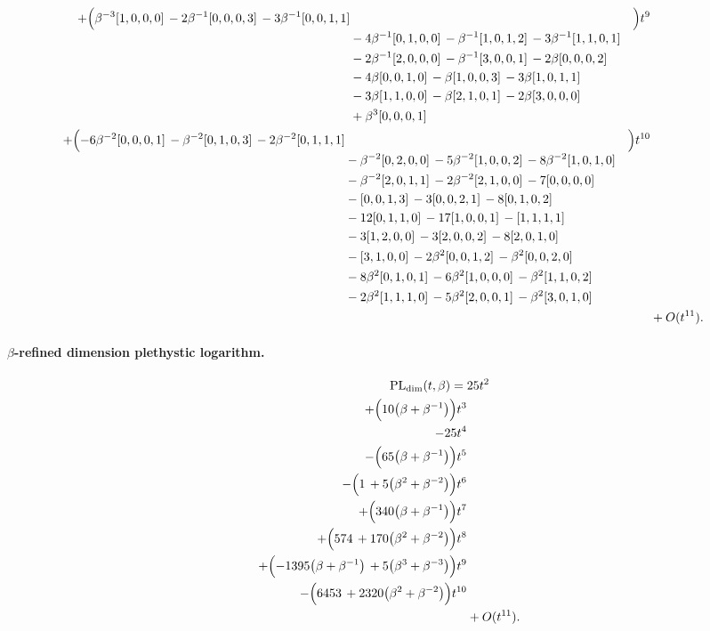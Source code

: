 \documentclass[10pt]{article}
\begin{document}
\[\begin{aligned}
  + \Bigl(\begin{aligned}[t]\beta^{-3}[1,0,0,0]\,-2\beta^{-1}[0,0,0,3]\,-3\beta^{-1}[0,0,1,1] \\
  &{}-4\beta^{-1}[0,1,0,0]\,-\beta^{-1}[1,0,1,2]\,-3\beta^{-1}[1,1,0,1] \\
  &{}-2\beta^{-1}[2,0,0,0]\,-\beta^{-1}[3,0,0,1]\,-2\beta[0,0,0,2] \\
  &{}-4\beta[0,0,1,0]\,-\beta[1,0,0,3]\,-3\beta[1,0,1,1] \\
  &{}-3\beta[1,1,0,0]\,-\beta[2,1,0,1]\,-2\beta[3,0,0,0] \\
  &{}+\beta^{3}[0,0,0,1]\end{aligned}\Bigr)t^{9} \\
  + \Bigl(\begin{aligned}[t]-6\beta^{-2}[0,0,0,1]\,-\beta^{-2}[0,1,0,3]\,-2\beta^{-2}[0,1,1,1] \\
  &{}-\beta^{-2}[0,2,0,0]\,-5\beta^{-2}[1,0,0,2]\,-8\beta^{-2}[1,0,1,0] \\
  &{}-\beta^{-2}[2,0,1,1]\,-2\beta^{-2}[2,1,0,0]\,-7[0,0,0,0] \\
  &{}-[0,0,1,3]\,-3[0,0,2,1]\,-8[0,1,0,2] \\
  &{}-12[0,1,1,0]\,-17[1,0,0,1]\,-[1,1,1,1] \\
  &{}-3[1,2,0,0]\,-3[2,0,0,2]\,-8[2,0,1,0] \\
  &{}-[3,1,0,0]\,-2\beta^{2}[0,0,1,2]\,-\beta^{2}[0,0,2,0] \\
  &{}-8\beta^{2}[0,1,0,1]\,-6\beta^{2}[1,0,0,0]\,-\beta^{2}[1,1,0,2] \\
  &{}-2\beta^{2}[1,1,1,0]\,-5\beta^{2}[2,0,0,1]\,-\beta^{2}[3,0,1,0]\end{aligned}\Bigr)t^{10} \\
  &+ O(t^{11}).
\end{aligned}
\]
\paragraph{$\beta$-refined dimension plethystic logarithm.}
\[
\begin{aligned}
\operatorname{PL}_{\mathrm{dim}}(t,\beta) ={}&
   25t^{2} \\
  + \Bigl(10\bigl(\beta+\beta^{-1}\bigr)\Bigr)t^{3} \\
  -25t^{4} \\
  -\Bigl(65\bigl(\beta+\beta^{-1}\bigr)\Bigr)t^{5} \\
  -\Bigl(1\,+5\bigl(\beta^{2}+\beta^{-2}\bigr)\Bigr)t^{6} \\
  + \Bigl(340\bigl(\beta+\beta^{-1}\bigr)\Bigr)t^{7} \\
  + \Bigl(574\,+170\bigl(\beta^{2}+\beta^{-2}\bigr)\Bigr)t^{8} \\
  + \Bigl(-1395\bigl(\beta+\beta^{-1}\bigr)\,+5\bigl(\beta^{3}+\beta^{-3}\bigr)\Bigr)t^{9} \\
  -\Bigl(6453\,+2320\bigl(\beta^{2}+\beta^{-2}\bigr)\Bigr)t^{10} \\
  &+ O(t^{11}).
\end{aligned}
\]
\end{document}
